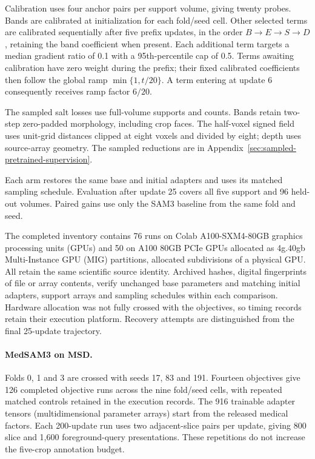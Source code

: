 \documentclass[12pt,a4paper]{article}
\begin{document}
Calibration uses four anchor pairs per support volume, giving twenty
probes. Bands are calibrated at initialization for each fold/seed cell.
Other selected terms are calibrated sequentially after five prefix
updates, in the order $B\to E\to S\to D$, retaining the band
coefficient when present. Each additional term targets a median
gradient ratio of 0.1 with a 95th-percentile cap of 0.5. Terms awaiting
calibration have zero weight during the prefix; their fixed calibrated
coefficients then follow the global ramp $\min\{1,t/20\}$. A term
entering at update 6 consequently receives ramp factor $6/20$.

The sampled salt losses use full-volume supports and counts. Bands
retain two-step zero-padded morphology, including crop faces.
The half-voxel signed field uses unit-grid distances clipped at eight
voxels and divided by eight; depth uses source-array geometry.
The sampled reductions are in
Appendix~\ref{sec:sampled-pretrained-supervision}.

Each arm restores the same base and initial adapters and uses its
matched sampling schedule. Evaluation after update 25 covers all five
support and 96 held-out volumes. Paired gains use only the SAM3
baseline from the same fold and seed.

The completed inventory contains 76 runs on Colab A100-SXM4-80GB graphics
processing units (GPUs) and 50 on A100 80GB PCIe GPUs allocated as 4g.40gb
Multi-Instance GPU (MIG) partitions, allocated subdivisions of a physical
GPU. All retain the same scientific source identity. Archived hashes,
digital fingerprints of file or array contents, verify unchanged base
parameters and matching initial adapters, support arrays and sampling
schedules within each comparison. Hardware allocation was not fully crossed
with the objectives, so timing records retain their execution platform.
Recovery attempts are distinguished from the final 25-update trajectory.

\paragraph{MedSAM3 on MSD.}\label{sec:medsam-methods-details}
Folds 0, 1 and 3 are crossed with seeds 17, 83 and 191. Fourteen
objectives give 126 completed objective runs across the
nine fold/seed cells, with repeated matched controls retained in the
execution records. The 916 trainable adapter tensors (multidimensional parameter arrays)
start from the
released medical factors. Each 200-update run uses two adjacent-slice pairs per update,
giving 800 slice and 1,600 foreground-query presentations. These
repetitions do not increase the five-crop annotation budget.
\end{document}
